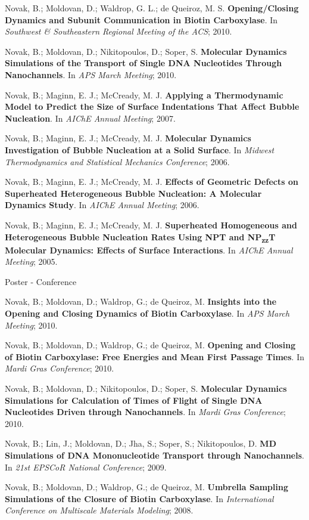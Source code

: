 \begin{cventries}
{\begin{cvitems}
        \item {Novak, B.; Moldovan, D.; Waldrop, G. L.; de Queiroz, M. S. \textbf{Opening/Closing Dynamics and Subunit Communication in Biotin Carboxylase}. In \textit{Southwest \& Southeastern Regional Meeting of the ACS}; 2010.}
        \item {Novak, B.; Moldovan, D.; Nikitopoulos, D.; Soper, S. \textbf{Molecular Dynamics Simulations of the Transport of Single DNA Nucleotides Through Nanochannels}. In \textit{APS March Meeting}; 2010.}
        \item{Novak, B.; Maginn, E. J.; McCready, M. J. \textbf{Applying a Thermodynamic Model to Predict the Size of Surface Indentations That Affect Bubble Nucleation}. In \textit{AIChE Annual Meeting}; 2007.}
        \item {Novak, B.; Maginn, E. J.; McCready, M. J. \textbf{Molecular Dynamics Investigation of Bubble Nucleation at a Solid Surface}. In \textit{Midwest Thermodynamics and Statistical Mechanics Conference}; 2006.}
        \item {Novak, B.; Maginn, E. J.; McCready, M. J. \textbf{Effects of Geometric Defects on Superheated Heterogeneous Bubble Nucleation: A Molecular Dynamics Study}. In \textit{AIChE Annual Meeting}; 2006. }
        \item {Novak, B.; Maginn, E. J.; McCready, M. J. \textbf{Superheated Homogeneous and Heterogeneous Bubble Nucleation Rates Using NPT and NP\textsubscript{zz}T Molecular Dynamics: Effects of Surface Interactions}. In \textit{AIChE Annual Meeting}; 2005.}
      \end{cvitems}
    }
    
  \cventry
    {} %
    {Poster - Conference} %
    {} %
    {} %
    {
      \begin{cvitems}
        \item {Novak, B.; Moldovan, D.; Waldrop, G.; de Queiroz, M. \textbf{Insights into the Opening and Closing Dynamics of Biotin Carboxylase}. In \textit{APS March Meeting}; 2010.}        
        \item {Novak, B.; Moldovan, D.; Waldrop, G.; de Queiroz, M. \textbf{Opening and Closing of Biotin Carboxylase: Free Energies and Mean First Passage Times}. In \textit{Mardi Gras Conference}; 2010.}
        \item {Novak, B.; Moldovan, D.; Nikitopoulos, D.; Soper, S. \textbf{Molecular Dynamics Simulations for Calculation of Times of Flight of Single DNA Nucleotides Driven through Nanochannels}. In \textit{Mardi Gras Conference}; 2010.}
        \item {Novak, B.; Lin, J.; Moldovan, D.; Jha, S.; Soper, S.; Nikitopoulos, D. \textbf{MD Simulations of DNA Mononucleotide Transport through Nanochannels}. In \textit{21st EPSCoR National Conference}; 2009.}
        \item {Novak, B.; Moldovan, D.; Waldrop, G.; de Queiroz, M. \textbf{Umbrella Sampling Simulations of the Closure of Biotin Carboxylase}. In \textit{International Conference on Multiscale Materials Modeling}; 2008.}
      \end{cvitems}
    }
    

\end{cventries}
